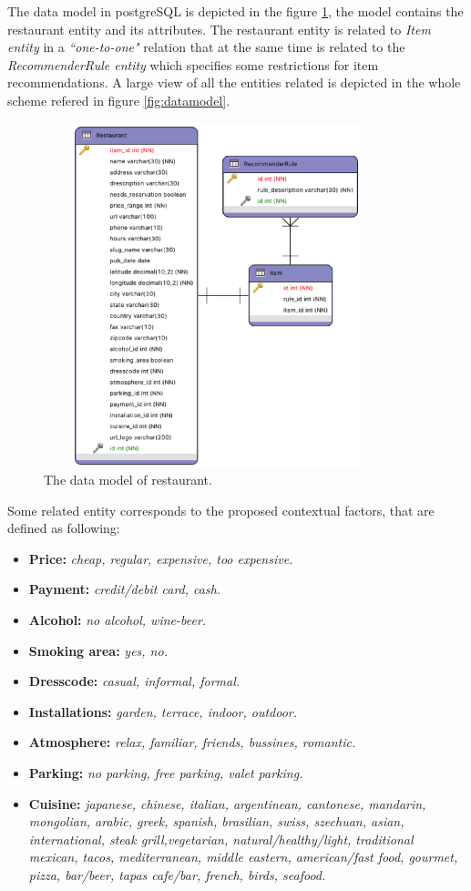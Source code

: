 The data model in postgreSQL is depicted in the figure
\ref{fig:restaurantmodeldata}, the model contains the restaurant
entity and its attributes. The restaurant entity is related to
\textit{Item entity} in a \textit{``one-to-one"} relation that at the
same time is related to the \textit{RecommenderRule entity} which
specifies some restrictions for item recommendations. A large view of
all the entities related is depicted in the whole scheme refered in
figure \ref{fig:datamodel}.
\begin{figure}
\captionsetup{justification=centering,margin=2cm,font=footnotesize}
\centering
\includegraphics[width=10cm,height=10cm,keepaspectratio]{img/data-resmodel.png}
\caption{The data model of restaurant.}
\label{fig:restaurantmodeldata}     
\end{figure}
Some related entity corresponds to the proposed contextual factors, 
that are defined as following: 
\begin{itemize}
\item \textbf{Price:} \textit{cheap, regular, expensive, too expensive.}
\item \textbf{Payment:} \textit{credit/debit card, cash.}
\item \textbf{Alcohol:} \textit{no alcohol, wine-beer.}
\item \textbf{Smoking area:} \textit{yes, no.}
\item \textbf{Dresscode:} \textit{casual, informal, formal.}
\item \textbf{Installations:} \textit{garden, terrace, indoor, outdoor.}
\item \textbf{Atmosphere:} \textit{relax, familiar, friends, bussines, romantic.}
\item \textbf{Parking:} \textit{no parking, free parking, valet parking.}
\item \textbf{Cuisine:} \textit{japanese, chinese, italian, argentinean,
cantonese, mandarin, mongolian, arabic, greek, spanish, brasilian,
swiss, szechuan, asian, international, steak grill,vegetarian,
natural/healthy/light, traditional mexican, tacos, mediterranean,
middle eastern, american/fast food, gourmet, pizza, bar/beer, tapas
cafe/bar, french, birds, seafood.}
\end{itemize}
